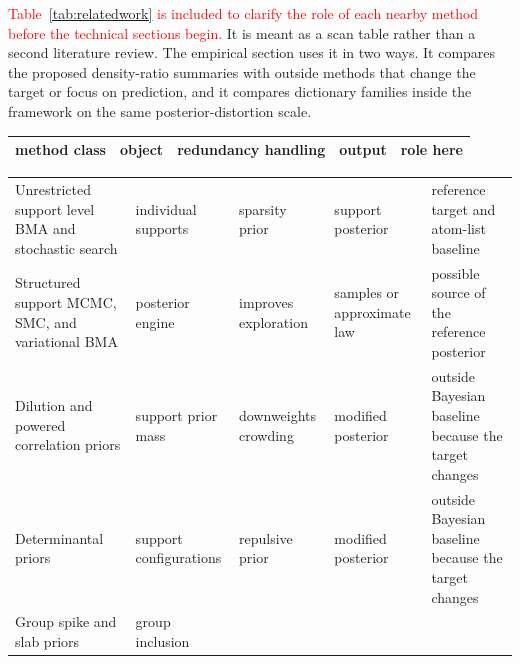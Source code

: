 \documentclass[twoside,11pt]{article}
\newcommand{\rev}[1]{\textcolor{red}{#1}}
\begin{document}
\rev{Table~\ref{tab:relatedwork} is included to clarify the role of each nearby method before the technical sections begin.} It is meant as a scan table rather than a second literature review. The empirical section uses it in two ways. It compares the proposed density-ratio summaries with outside methods that change the target or focus on prediction, and it compares dictionary families inside the framework on the same posterior-distortion scale.

\begin{table}[!htbp]
\centering
\scriptsize
\setlength{\tabcolsep}{3.0pt}
\renewcommand{\tabularxcolumn}[1]{m{#1}}
\setlength{\extrarowheight}{0pt}
\renewcommand{\arraystretch}{1.0}
\begin{tabularx}{0.985\textwidth}{@{}>{\raggedright\arraybackslash}m{}
>{\raggedright\arraybackslash}m{}
>{\raggedright\arraybackslash}m{}
>{\raggedright\arraybackslash}m{}
>{\raggedright\arraybackslash}X@{}}
\toprule
method class & object & redundancy handling & output & role here \\
\midrule
\end{tabularx}
\vspace{-0.25em}
\setlength{\extrarowheight}{1.0pt}
\renewcommand{\arraystretch}{1.30}
\begin{tabularx}{0.985\textwidth}{@{}>{\raggedright\arraybackslash}m{}
>{\raggedright\arraybackslash}m{}
>{\raggedright\arraybackslash}m{}
>{\raggedright\arraybackslash}m{}
>{\raggedright\arraybackslash}X@{}}
\rule[-0.85ex]{0pt}{3.7ex}Unrestricted support level BMA and stochastic search
& individual supports
& sparsity prior
& support posterior
& reference target and atom-list baseline \\
\rule[-0.85ex]{0pt}{3.7ex}Structured support MCMC, SMC, and variational BMA
& posterior engine
& improves exploration
& samples or approximate law
& possible source of the reference posterior \\
\rule[-0.85ex]{0pt}{3.7ex}Dilution and powered correlation priors
& support prior mass
& downweights crowding
& modified posterior
& outside Bayesian baseline because the target changes \\
\rule[-0.85ex]{0pt}{3.7ex}Determinantal priors
& support configurations
& repulsive prior
& modified posterior
& outside Bayesian baseline because the target changes \\
\rule[-0.85ex]{0pt}{3.7ex}Group spike and slab priors
& group inclusion

\end{tabularx}
\end{table}
\end{document}
